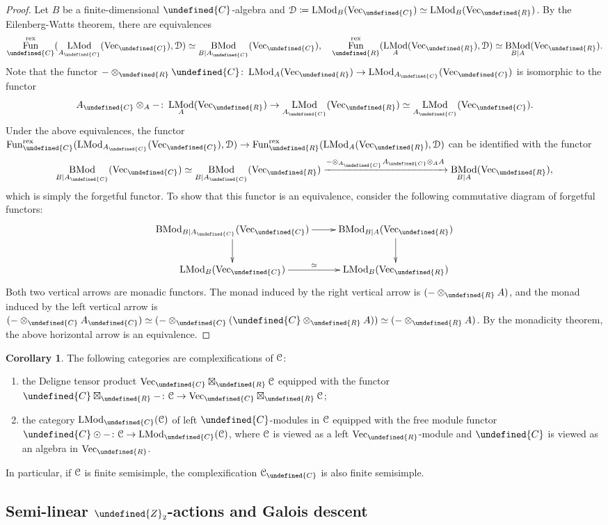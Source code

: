 \documentclass[10pt]{article}
\let\mathbb\undefined
\theoremstyle{definition}
\newtheorem{cor}[thm]{Corollary}
\numberwithin{equation}{section}
\numberwithin{thm}{section}
\newcommand{\bnu}{\begin{enumerate}}
\newcommand{\enu}{\end{enumerate}}
\newcommand{\pf}{\begin{proof}}
\newcommand{\epf}{\end{proof}}
\newcommand{\Cb}{\mathbb{C}}
\newcommand{\Rb}{\mathbb{R}}
\newcommand{\Zb}{\mathbb{Z}}
\newcommand{\CC}{\EuScript{C}}
\newcommand{\CD}{\EuScript{D}}
\DeclareMathOperator{\fun}{Fun}
\DeclareMathOperator{\LMod}{LMod}
\DeclareMathOperator{\BMod}{BMod}
\newcommand{\vect}{\mathrm{Vec}}
\begin{document}
\pf
Let $B$ be a finite-dimensional $\Cb$-algebra and $\CD \coloneqq \LMod_B(\vect_\Cb) \simeq \LMod_B(\vect_\Rb)$. By the Eilenberg-Watts theorem, there are equivalences
\[
\fun_\Cb^{\mathrm{rex}}(\LMod_{A_\Cb}(\vect_\Cb),\CD) \simeq \BMod_{B|A_\Cb}(\vect_\Cb) , \quad \fun_\Rb^{\mathrm{rex}}(\LMod_A(\vect_\Rb),\CD) \simeq \BMod_{B|A}(\vect_\Rb) .
\]
Note that the functor $- \otimes_\Rb \Cb \colon \LMod_A(\vect_\Rb) \to \LMod_{A_\Cb}(\vect_\Cb)$ is isomorphic to the functor
\[
A_\Cb \otimes_A - \colon \LMod_A(\vect_\Rb) \to \LMod_{A_\Cb}(\vect_\Rb) \simeq \LMod_{A_\Cb}(\vect_\Cb) .
\]
Under the above equivalences, the functor $\fun_\Cb^{\mathrm{rex}}(\LMod_{A_\Cb}(\vect_\Cb),\CD) \to \fun_\Rb^{\mathrm{rex}}(\LMod_A(\vect_\Rb),\CD)$ can be identified with the functor
\[
\BMod_{B|A_\Cb}(\vect_\Cb) \simeq \BMod_{B|A_\Cb}(\vect_\Rb) \xrightarrow{- \otimes_{A_\Cb} A_\Cb \otimes_A A} \BMod_{B|A}(\vect_\Rb) ,
\]
which is simply the forgetful functor. To show that this functor is an equivalence, consider the following commutative diagram of forgetful functors:
\[
\xymatrix{
\BMod_{B|A_\Cb}(\vect_\Cb) \ar[r] \ar[d] & \BMod_{B|A}(\vect_\Rb) \ar[d] \\
\LMod_B(\vect_\Cb) \ar[r]^-{\simeq} & \LMod_B(\vect_\Rb)
}
\]
Both two vertical arrows are monadic functors. The monad induced by the right vertical arrow is $(- \otimes_\Rb A)$, and the monad induced by the left vertical arrow is $(- \otimes_\Cb A_\Cb) \simeq (- \otimes_\Cb (\Cb \otimes_\Rb A)) \simeq (- \otimes_\Rb A)$. By the monadicity theorem, the above horizontal arrow is an equivalence.
\epf

\begin{cor}
The following categories are complexifications of $\CC$:
\bnu[(1)]
\item the Deligne tensor product $\vect_\Cb \boxtimes_\Rb \CC$ equipped with the functor $\Cb \boxtimes_\Rb - \colon \CC \to \vect_\Cb \boxtimes_\Rb \CC$;
\item the category $\LMod_\Cb(\CC)$ of left $\Cb$-modules in $\CC$ equipped with the free module functor $\Cb \odot - \colon \CC \to \LMod_\Cb(\CC)$, where $\CC$ is viewed as a left $\vect_\Rb$-module and $\Cb$ is viewed as an algebra in $\vect_\Rb$.
\enu
\end{cor}

In particular, if $\CC$ is finite semisimple, the complexification $\CC_\Cb$ is also finite semisimple.

\subsection{Semi-linear \texorpdfstring{$\Zb_2$}{Z2}-actions and Galois descent}
\end{document}
